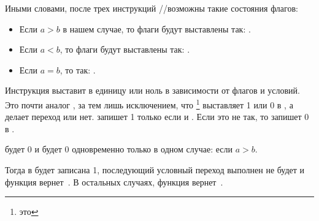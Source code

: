 Иными словами, после трех инструкций \FUCOMPP/\FNSTSW/\SAHF возможны такие состояния флагов:

\begin{itemize}
\item Если $a>b$ в нашем случае, то флаги будут выставлены так: .
\item Если $a<b$, то флаги будут выставлены так: .
\item Если $a=b$, то так: .
\end{itemize}

Инструкция \SETNBE выставит в \AL единицу или ноль в зависимости от флагов и условий. 
Это почти аналог \JNBE, за тем лишь исключением, что \SETcc
\footnote{ это }
выставляет 1 или 0 в \AL, а \Jcc делает переход или нет. 
\SETNBE запишет 1 только если  и . Если это не так, то запишет 0 в \AL.

\CF будет 0 и \ZF будет 0 одновременно только в одном случае: если $a>b$.

Тогда в \AL будет записана 1, последующий условный переход \JZ выполнен не будет 
и функция вернет~. 
В остальных случаях, функция вернет~.
